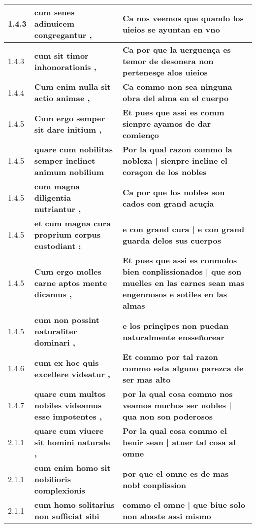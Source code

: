 \begin{tabular}{|p{1cm}|p{6.5cm}|p{6.5cm}|}
1.4.3 &  \textbf{ cum senes adinuicem congregantur , }  &  \textbf{ Ca nos veemos que quando los uieios se ayuntan en vno }  \\\hline
1.4.3 &  \textbf{ cum sit timor inhonorationis , }  &  \textbf{ Ca por que la uerguença es temor de desonera non pertenesçe alos uieios }  \\\hline
1.4.4 &  \textbf{ Cum enim nulla sit actio animae , }  &  \textbf{ Ca commo non sea ninguna obra del alma en el cuerpo }  \\\hline
1.4.5 &  \textbf{ Cum ergo semper sit dare initium , }  &  \textbf{ Et pues que assi es comm sienpre ayamos de dar comienço }  \\\hline
1.4.5 &  \textbf{ quare cum nobilitas semper inclinet animum nobilium }  &  \textbf{ Por la qual razon commo la nobleza | sienpre incline el coraçon de los nobles }  \\\hline
1.4.5 &  \textbf{ cum magna diligentia nutriantur , }  &  \textbf{ Ca por que los nobles son cados con grand acuçia }  \\\hline
1.4.5 &  \textbf{ et cum magna cura proprium corpus custodiant : }  &  \textbf{ e con grand cura | e con grand guarda delos sus cuerpos }  \\\hline
1.4.5 &  \textbf{ Cum ergo molles carne aptos mente dicamus , }  &  \textbf{ Et pues que assi es conmolos bien conplissionados | que son muelles en las carnes sean mas engennosos e sotiles en las almas }  \\\hline
1.4.5 &  \textbf{ cum non possint naturaliter dominari , }  &  \textbf{ e los prinçipes non puedan naturalmente ensseñorear }  \\\hline
1.4.6 &  \textbf{ cum ex hoc quis excellere videatur , }  &  \textbf{ Et commo por tal razon commo esta alguno parezca de ser mas alto }  \\\hline
1.4.7 &  \textbf{ quare cum multos nobiles videamus esse impotentes , }  &  \textbf{ por la qual cosa commo nos veamos muchos ser nobles | qua non son poderosos }  \\\hline
2.1.1 &  \textbf{ quare cum viuere sit homini naturale , }  &  \textbf{ Por la qual cosa commo el beuir sean | atuer tal cosa al omne }  \\\hline
2.1.1 &  \textbf{ cum enim homo sit nobilioris complexionis }  &  \textbf{ por que el omne es de mas nobł conplission }  \\\hline
2.1.1 &  \textbf{ cum homo solitarius non sufficiat sibi }  &  \textbf{ commo el omne | que biue solo non abaste assi mismo }  \\\hline

\end{tabular}
